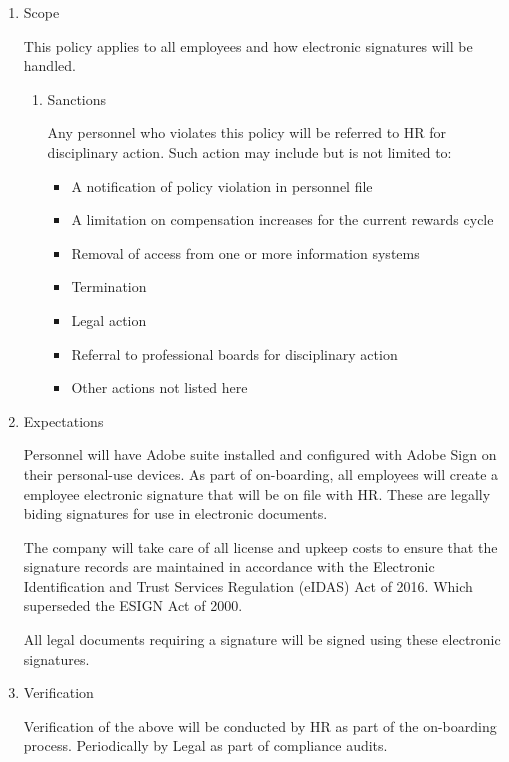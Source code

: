 \documentclass[stu]{apa7}
\begin{document}
\begin{enumerate}
\item Scope
\label{sec:org84727bd}

This policy applies to all employees and how electronic signatures will be handled.
\begin{enumerate}
\item Sanctions
\label{sec:org19d9340}

Any personnel who violates this policy will be referred to HR for disciplinary action. Such action may include but is not limited to:

\begin{itemize}
\item A notification of policy violation in personnel file
\item A limitation on compensation increases for the current rewards cycle
\item Removal of access from one or more information systems
\item Termination
\item Legal action
\item Referral to professional boards for disciplinary action
\item Other actions not listed here
\end{itemize}
\end{enumerate}

\item Expectations
\label{sec:org77a0bcd}

Personnel will have Adobe suite installed and configured with Adobe Sign on their personal-use devices. As part of on-boarding, all employees will create a employee electronic signature that will be on file with HR. These are legally biding signatures for use in electronic documents.

The company will take care of all license and upkeep costs to ensure that the signature records are maintained in accordance with the Electronic Identification and Trust Services Regulation (eIDAS) Act of 2016. Which superseded the ESIGN Act of 2000.

All legal documents requiring a signature will be signed using these electronic signatures.

\item Verification
\label{sec:org279954e}

Verification of the above will be conducted by HR as part of the on-boarding process. Periodically by Legal as part of compliance audits.
\end{enumerate}
\end{document}

